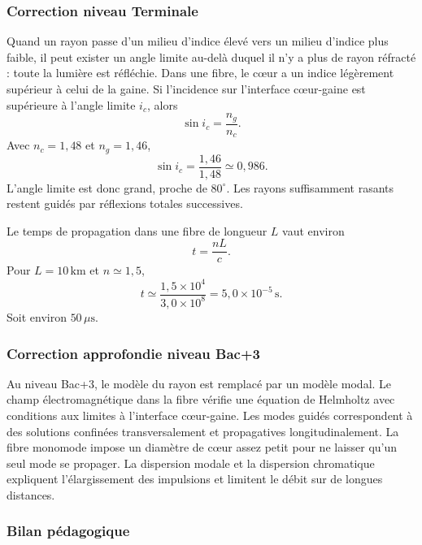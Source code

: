 \documentclass[11pt,a4paper]{article}
\begin{document}
\subsubsection*{Correction niveau Terminale}

\begin{corrigebox}

Quand un rayon passe d'un milieu d'indice élevé vers un milieu d'indice plus faible, il peut exister un angle limite au-delà duquel il n'y a plus de rayon réfracté : toute la lumière est réfléchie. Dans une fibre, le cœur a un indice légèrement supérieur à celui de la gaine. Si l'incidence sur l'interface cœur-gaine est supérieure à l'angle limite \(i_c\), alors
\[
\sin i_c=\frac{n_g}{n_c}.
\]
Avec \(n_c=1{,}48\) et \(n_g=1{,}46\),
\[
\sin i_c=\frac{1{,}46}{1{,}48}\simeq0{,}986.
\]
L'angle limite est donc grand, proche de \(80^\circ\). Les rayons suffisamment rasants restent guidés par réflexions totales successives.

Le temps de propagation dans une fibre de longueur \(L\) vaut environ
\[
t=\frac{nL}{c}.
\]
Pour \(L=10\,\mathrm{km}\) et \(n\simeq1{,}5\),
\[
t\simeq\frac{1{,}5\times10^4}{3{,}0\times10^8}
=5{,}0\times10^{-5}\,\mathrm s.
\]
Soit environ \(50\,\mu\mathrm s\).

\end{corrigebox}

\subsubsection*{Correction approfondie niveau Bac+3}

\begin{approfondissementbox}

Au niveau Bac+3, le modèle du rayon est remplacé par un modèle modal. Le champ électromagnétique dans la fibre vérifie une équation de Helmholtz avec conditions aux limites à l'interface cœur-gaine. Les modes guidés correspondent à des solutions confinées transversalement et propagatives longitudinalement. La fibre monomode impose un diamètre de cœur assez petit pour ne laisser qu'un seul mode se propager. La dispersion modale et la dispersion chromatique expliquent l'élargissement des impulsions et limitent le débit sur de longues distances.

\end{approfondissementbox}

\subsubsection*{Bilan pédagogique}
\end{document}
